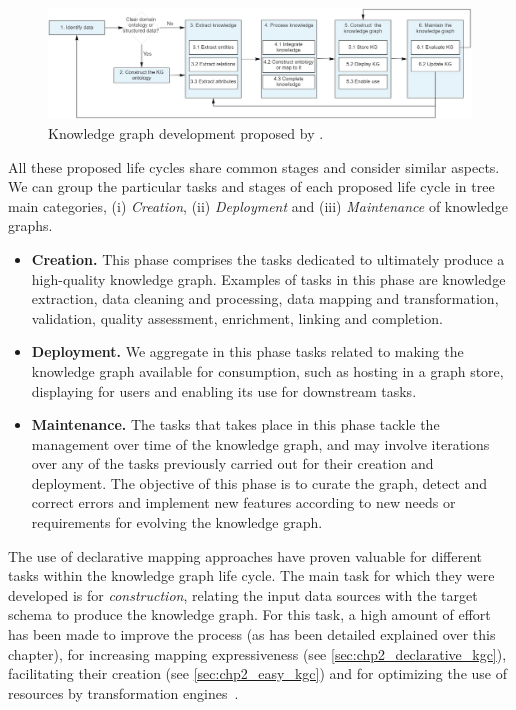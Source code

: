 \begin{figure}[]
\centering
\includegraphics[width=\linewidth]{figures/chp2_kg-dev-process.png}
\caption{Knowledge graph development proposed by \cite{tamavsauskaite2023defining}.}
\label{fig:chp2_kg-dev-process}
\end{figure}

All these proposed life cycles share common stages and consider similar aspects. We can group the particular tasks and stages of each proposed life cycle in tree main categories, (i) \textit{Creation}, (ii) \textit{Deployment} and (iii) \textit{Maintenance} of knowledge graphs. 
\begin{itemize}
    \item \textbf{Creation.} This phase comprises the tasks dedicated to ultimately produce a high-quality knowledge graph. Examples of tasks in this phase are knowledge extraction, data cleaning and processing, data mapping and transformation, validation, quality assessment, enrichment, linking and completion.

    \item \textbf{Deployment.} We aggregate in this phase tasks related to making the knowledge graph available for consumption, such as hosting in a graph store, displaying for users and enabling its use for downstream tasks. 

    \item \textbf{Maintenance.} The tasks that takes place in this phase tackle the management over time of the knowledge graph, and may involve iterations over any of the tasks previously carried out for their creation and deployment. The objective of this phase is to curate the graph, detect and correct errors and implement new features according to new needs or requirements for evolving the knowledge graph.
\end{itemize}

The use of declarative mapping approaches have proven valuable for different tasks within the knowledge graph life cycle. The main task for which they were developed is for \textit{construction}, relating the input data sources with the target schema to produce the knowledge graph. For this task, a high amount of effort has been made to improve the process (as has been detailed explained over this chapter), for increasing mapping expressiveness (see \cref{sec:chp2_declarative_kgc}), facilitating their creation (see \cref{sec:chp2_easy_kgc}) and for optimizing the use of resources by transformation engines~\parencite{arenas2022morphkgc,iglesias2023scaling,xiao2020virtual,iglesias2022empowering,jozashoori2019mapsdi}. 

